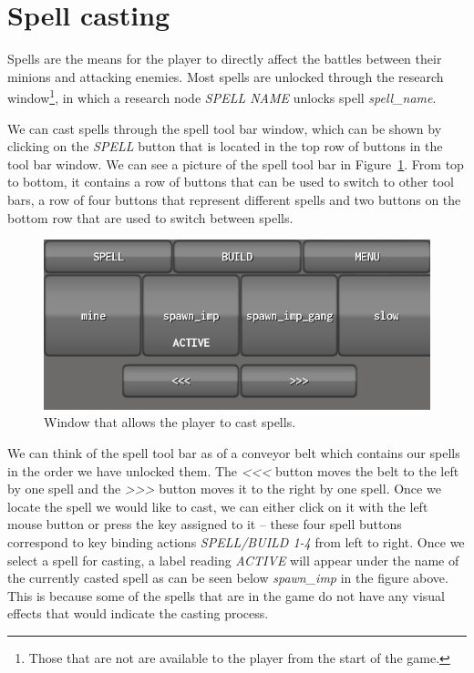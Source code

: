 \section{Spell casting}

Spells are the means for the player to directly affect the battles between their minions and attacking enemies. Most spells are unlocked
through the research window\footnote{Those that are not are available to the player from the start of the game.}, in which a research
node \emph{SPELL NAME} unlocks spell \emph{spell\_name}.

We can cast spells through the spell tool bar window, which can be shown by clicking on the \emph{SPELL} button that is located in the
top row of buttons in the tool bar window. We can see a picture of the spell tool bar in Figure~\ref{gui-spell}. From top to bottom, it
contains a row of buttons that can be used to switch to other tool bars, a row of four buttons that represent different spells and two
buttons on the bottom row that are used to switch between spells.

\begin{figure}[H]
    \centering
    \includegraphics[width=\textwidth]{../img/tool-spell.png}
    \caption{Window that allows the player to cast spells.}
    \label{gui-spell}
\end{figure}

We can think of the spell tool bar as of a conveyor belt which contains our spells in the order we have unlocked them. The
\emph{\textless\textless\textless} button moves the belt to the left by one spell and the \emph{\textgreater\textgreater\textgreater}
button moves it to the right by one spell. Once we locate the spell we would
like to cast, we can either click on it with the left mouse button or press the key assigned to it -- these four spell buttons correspond
to key binding actions \emph{SPELL/BUILD 1-4} from left to right. Once we select a spell for casting, a label reading \emph{ACTIVE} will
appear under the name of the currently casted spell as can be seen below \emph{spawn\_imp} in the figure above. This is because some of
the spells that are in the game do not have any visual effects that would indicate the casting process.

